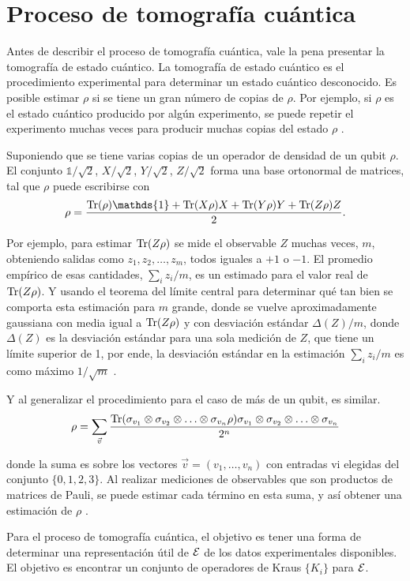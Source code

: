 \section{Proceso de tomografía cuántica}

Antes de describir el proceso de tomografía cuántica, vale la pena presentar la tomografía de estado cuántico. La tomografía de estado cuántico es el procedimiento experimental para determinar un estado cuántico desconocido. Es posible estimar $\rho$ si se tiene un gran número de copias de $\rho$. Por ejemplo, si $\rho$ es el estado cuántico producido por algún experimento, se puede repetir el experimento muchas veces para producir muchas copias del estado $\rho$ {\cite{nielsen_chuang_2010}}. 

Suponiendo que se tiene varias copias de un operador de densidad de un qubit $\rho$. El conjunto $\mathds{1}/\sqrt{2}$, $X/\sqrt{2}$, $Y/\sqrt{2}$, $Z/\sqrt{2}$ forma una base ortonormal de matrices, tal que $\rho$  puede escribirse con \[\rho=\dfrac{\tr(\rho)\mathds{1}+\tr(X\rho)X+\tr(Y\rho)Y+\tr(Z\rho)Z}{2}.\]

Por ejemplo, para estimar ${\rm Tr}(Z\rho)$ se mide el observable $Z$ muchas veces, $m$, obteniendo salidas como $z_1,z_2,\ldots,z_m$, todos iguales a $+1$ o $-1$. El promedio empírico de esas cantidades, $\sum_i z_i/m$, es un estimado para el valor real de ${\rm Tr}(Z\rho)$. Y usando el teorema del límite central para determinar qué tan bien se comporta esta estimación para $m$ grande, donde se vuelve aproximadamente gaussiana con media igual a ${\rm Tr}(Z\rho)$ y con desviación estándar  $\Delta(Z)/ m$, donde $\Delta(Z)$ es la desviación estándar para una sola medición de $Z$, que tiene un límite superior de 1, por ende, la desviación estándar en la estimación $\sum_i z_i/m$ es como máximo $1/\sqrt{m}$ {\cite{nielsen_chuang_2010}}. 

Y al generalizar el procedimiento para el caso de más de un qubit, es similar.
\[\rho=\sum_{\vec{v}}\dfrac{{\rm Tr}(\sigma_{v_1}\otimes\sigma_{v_2}\otimes \ldots \otimes \sigma_{v_n}\rho)\sigma_{v_1}\otimes\sigma_{v_2}\otimes \ldots \otimes \sigma_{v_n}}{2^n}\]

donde la suma es sobre los vectores $\vec{v} = (v_1 ,\ldots, v_n )$ con entradas vi elegidas del conjunto $\{0, 1, 2, 3\}$. Al realizar mediciones de observables que son productos de matrices de Pauli, se puede estimar cada término en esta suma, y así obtener una estimación de $\rho$ {\cite{nielsen_chuang_2010}}.

Para el proceso de tomografía cuántica, el objetivo es tener una forma de determinar una representación útil de $\mathcal{E}$  de los datos experimentales disponibles. El objetivo es encontrar un conjunto de operadores de Kraus $\{K_i\}$ para $\mathcal{E}$.


